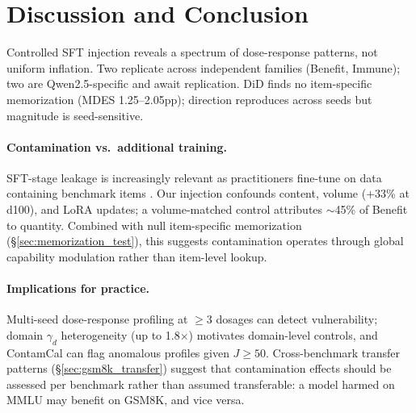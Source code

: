 \section{Discussion and Conclusion}\label{sec:conclusion}

Controlled SFT injection reveals a spectrum of dose-response patterns, not uniform inflation. Two replicate across independent families (Benefit, Immune); two are Qwen2.5-specific and await replication. DiD finds no item-specific memorization (MDES 1.25--2.05pp); direction reproduces across seeds but magnitude is seed-sensitive.

\paragraph{Contamination vs.\ additional training.}
SFT-stage leakage is increasingly relevant as practitioners fine-tune on data containing benchmark items \citep{balloccu2024leak}. Our injection confounds content, volume ($+$33\% at d100), and LoRA updates; a volume-matched control attributes ${\sim}$45\% of Benefit to quantity. Combined with null item-specific memorization (\S\ref{sec:memorization_test}), this suggests contamination operates through global capability modulation rather than item-level lookup.

\paragraph{Implications for practice.}
Multi-seed dose-response profiling at $\geq$3 dosages can detect vulnerability; domain $\gamma_d$ heterogeneity (up to 1.8$\times$) motivates domain-level controls, and ContamCal can flag anomalous profiles given $J \geq 50$. Cross-benchmark transfer patterns (\S\ref{sec:gsm8k_transfer}) suggest that contamination effects should be assessed per benchmark rather than assumed transferable: a model harmed on MMLU may benefit on GSM8K, and vice versa.
